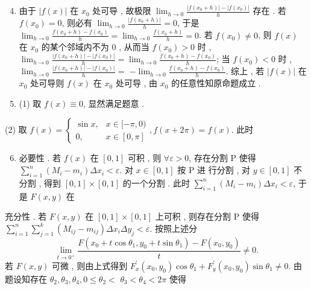 \documentclass[10pt]{article}
\begin{document}
\begin{enumerate}
  \setcounter{enumi}{3}
  \item  由于  $|f(x)|$  在  $x_{0}$  处可导 ,  故极限  $\lim _{h \rightarrow 0} \frac{\left|f\left(x_{0}+h\right)\right|-\left|f\left(x_{0}\right)\right|}{h}$  存在 .  若  $f\left(x_{0}\right)=0$,  则必有  $\lim _{h \rightarrow 0} \frac{\left|f\left(x_{0}+h\right)\right|}{h}=0$,  于是  $\lim _{h \rightarrow 0} \frac{f\left(x_{0}+h\right)-f\left(x_{0}\right)}{h}=\lim _{h \rightarrow 0} \frac{f\left(x_{0}+h\right)}{h}=0$.  若  $f\left(x_{0}\right) \neq 0$,  则  $f(x)$  在  $x_{0}$  的某个邻域内不为  0 ,  从而当  $f\left(x_{0}\right)>0$  时 , $\lim _{h \rightarrow 0} \frac{\left|f\left(x_{0}+h\right)\right|-\left|f\left(x_{0}\right)\right|}{h}=\lim _{h \rightarrow 0} \frac{f\left(x_{0}+h\right)-f\left(x_{0}\right)}{h}$;  当  $f\left(x_{0}\right)<0$  时 , $\lim _{h \rightarrow 0} \frac{\left|f\left(x_{0}+h\right)\right|-\left|f\left(x_{0}\right)\right|}{h}=$ $-\lim _{h \rightarrow 0} \frac{f\left(x_{0}+h\right)-f\left(x_{0}\right)}{h}$.  综上 ,  若  $|f(x)|$  在  $x_{0}$  处可导则  $f(x)$  在  $x_{0}$  处可导 ,  由  $x_{0}$  的任意性知原命题成立 .

  \item (1)  取  $f(x) \equiv 0$,  显然满足题意 .

\end{enumerate}
(2)  取  $f(x)=\left\{\begin{array}{ll}\sin x, & x \in[-\pi, 0) \\ 0, & x \in[0, \pi]\end{array}, f(x+2 \pi)=f(x)\right.$.  此时 

\begin{enumerate}
  \setcounter{enumi}{5}
  \item  必要性 .  若  $f(x)$  在  $[0,1]$  可积 ,  则  $\forall \varepsilon>0$,  存在分割  $\mathrm{P}$  使得  $\sum_{i=1}^{n}\left(M_{i}-m_{i}\right) \Delta x_{i}<\varepsilon$.  对  $x \in[0,1]$  按  $\mathrm{P}$  进   行分割 ,  对  $y \in[0,1]$  不分割 ,  得到  $[0,1] \times[0,1]$  的一个分割 .  此时  $\sum_{i=1}^{n}\left(M_{i}-m_{i}\right) \Delta x_{i}<\varepsilon$,  于是  $F(x, y)$  在 
\end{enumerate}
 充分性 . 若  $F(x, y)$  在  $[0,1] \times[0,1]$  上可积 ,  则存在分割  $\mathrm{P}$  使得  $\sum_{i=1}^{n} \sum_{j=1}^{k}\left(M_{i j}-m_{i j}\right) \Delta x_{i} \Delta y_{j}<\varepsilon$.  按照上述分 
$$
\lim _{t \rightarrow 0^{+}} \frac{F\left(x_{0}+t \cos \theta_{1}, y_{0}+t \sin \theta_{1}\right)-F\left(x_{0}, y_{0}\right)}{t} \neq 0 .
$$
 若  $F(x, y)$  可微 ,  则由上式得到  $F_{x}^{\prime}\left(x_{0}, y_{0}\right) \cos \theta_{1}+F_{y}^{\prime}\left(x_{0}, y_{0}\right) \sin \theta_{1} \neq 0$.  由题设知存在  $\theta_{2}, \theta_{3}, \theta_{4}, 0 \leqslant \theta_{2}<$ $\theta_{3}<\theta_{4}<2 \pi$  使得 
\end{document}
